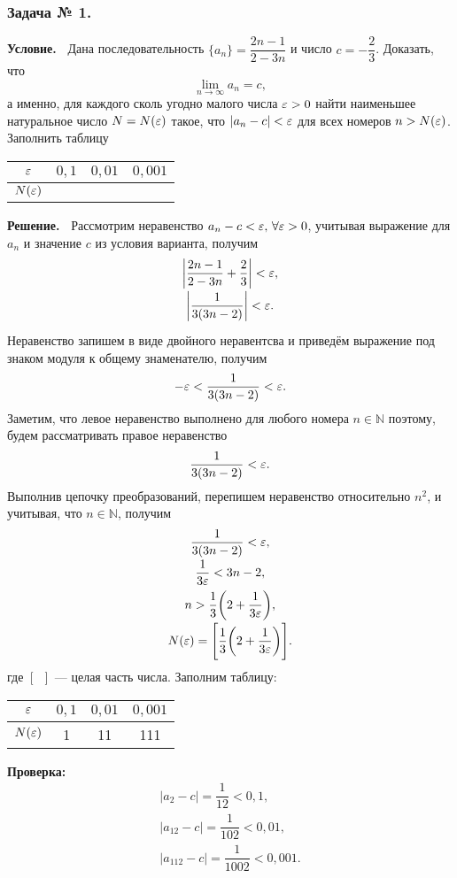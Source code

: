 \subsubsection*{\center Задача № 1.}
{\bf Условие.~}
Дана последовательность $\{a_n\} = \dfrac{2n-1}{2-3n}$ и число $c=-\dfrac{2}{3}$. Доказать, что 
$$\lim\limits_{n\rightarrow\infty}a_n=c,$$
а именно, для каждого сколь угодно малого числа $\varepsilon>0$ найти наименьшее натуральное число 
$N=N(\varepsilon)$ такое, что $|a_n-c|<\varepsilon$ для всех номеров $n>N(\varepsilon)$.
Заполнить таблицу
\begin{center}
	\begin{tabular}{|c|c|c|c|}
		\hline
		$\varepsilon$ &  $0{,}1$ & $0{,}01$ & $0{,}001$ \\
		\hline
		$N(\varepsilon)$ & & & \\
		\hline
	\end{tabular}
\end{center}
{\bf Решение.~}	
Рассмотрим неравенство $a_n-c<\varepsilon,\,\forall\varepsilon>0$, учитывая выражение для $a_n$ и значение $c$ из условия варианта,
получим
$$
\begin{array}{c}
\biggl|\dfrac{2n-1}{2-3n}+\dfrac23\biggr| < \varepsilon,     \\[8pt]
\biggl|\dfrac{1}{3(3n-2)}\biggr| < \varepsilon. 			  \\[8pt]	        
\end{array}
$$
Неравенство запишем в виде двойного неравентсва и приведём выражение под знаком модуля к общему знаменателю,
получим
$$
-\varepsilon < \frac{1}{3(3n-2)} < \varepsilon.
$$
Заметим, что левое неравенство выполнено для любого номера $n\in\mathbb{N}$ поэтому, будем рассматривать правое неравенство 
$$
\frac{1}{3(3n-2)} < \varepsilon.
$$
Выполнив цепочку преобразований, перепишем неравенство относительно $n^2$, и учитывая, что $n\in\mathbb{N}$, получим
$$
\begin{array}{c}
\dfrac{1}{3(3n-2)} < \varepsilon, 							\\[8pt]
\dfrac{1}{3\varepsilon} < 3n-2, 							\\[8pt]
n > \dfrac{1}{3}\biggl(2+\dfrac{1}{3\varepsilon}\biggr) , 		\\[8pt]
N(\varepsilon) = \Biggl[\dfrac{1}{3}\biggl(2+\dfrac{1}{3\varepsilon}\biggr)\Biggr].
\end{array}
$$
где $[\phantom{a}]$ --- целая часть числа.
Заполним таблицу:
\begin{center}
	\begin{tabular}{|c|c|c|c|}
		\hline
		$\varepsilon$ &  $0{,}1$ & $0{,}01$ & $0{,}001$ \\
		\hline
		$N(\varepsilon)$ & 1 & 11 & 111 \\
		\hline
	\end{tabular}
\end{center}
\textbf{Проверка:}
$$
\begin{array}{l}
|a_2 - c| = \dfrac{1}{12} < 0{,}1,			\\[10pt]
|a_{12} - c| = \dfrac{1}{102} < 0{,}01,	\\[10pt]
|a_{112} - c| = \dfrac{1}{1002} < 0{,}001.
\end{array}
$$

